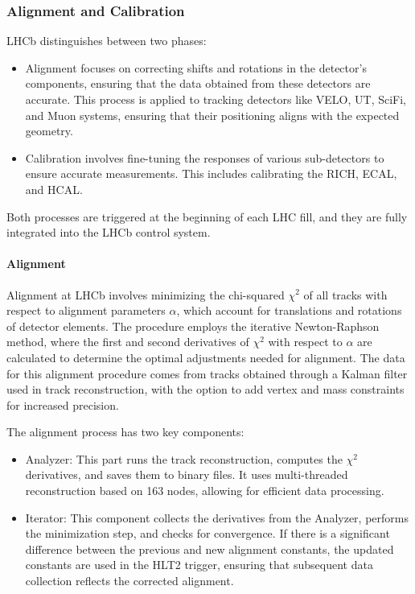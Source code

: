 \subsubsection{Alignment and Calibration}\label{sec:alignment}
LHCb distinguishes between two phases\cite{Dziurda:2640712}:
\begin{itemize}
\item Alignment focuses on correcting shifts and rotations in the detector's components, ensuring that the data obtained from these detectors are accurate. This process is applied to tracking detectors like VELO, UT, SciFi, and Muon systems, ensuring that their positioning aligns with the expected geometry.
\item Calibration involves fine-tuning the responses of various sub-detectors to ensure accurate measurements. This includes calibrating the RICH, ECAL, and HCAL.
\end{itemize}
Both processes are triggered at the beginning of each LHC fill, and they are fully integrated into the LHCb control system. 
\paragraph{Alignment}
Alignment at LHCb involves minimizing the chi-squared $\chi^2$ of all tracks with respect to alignment parameters $\alpha$, which account for translations and rotations of detector elements. The procedure employs the iterative Newton-Raphson method, where the first and second derivatives of $\chi^2$ with respect to 
 $\alpha$ are calculated to determine the optimal adjustments needed for alignment. The data for this alignment procedure comes from tracks obtained through a Kalman filter used in track reconstruction\cite{HULSBERGEN2009471}, with the option to add vertex and mass constraints for increased precision.

The alignment process has two key components:
\begin{itemize}
\item Analyzer: This part runs the track reconstruction, computes the $\chi^2$ derivatives, and saves them to binary files. It uses multi-threaded reconstruction based on 163 nodes, allowing for efficient data processing.
\item Iterator: This component collects the derivatives from the Analyzer, performs the minimization step, and checks for convergence. If there is a significant difference between the previous and new alignment constants, the updated constants are used in the HLT2 trigger, ensuring that subsequent data collection reflects the corrected alignment.
\end{itemize}

